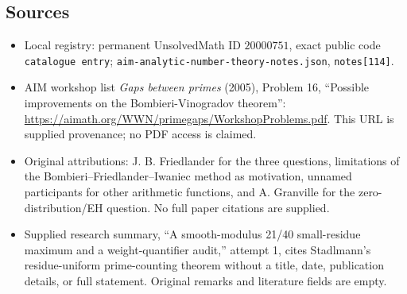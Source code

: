 \documentclass[11pt]{article}
\begin{document}
\subsection{Sources}
\begin{itemize}
\item Local registry: permanent UnsolvedMath ID \(20000751\), exact public code \texttt{catalogue entry}; \texttt{aim-analytic-number-theory-notes.json}, \texttt{notes[114]}.
\item AIM workshop list \emph{Gaps between primes} (2005), Problem 16, ``Possible improvements on the Bombieri-Vinogradov theorem'': \url{https://aimath.org/WWN/primegaps/WorkshopProblems.pdf}. This URL is supplied provenance; no PDF access is claimed.
\item Original attributions: J. B. Friedlander for the three questions, limitations of the Bombieri--Friedlander--Iwaniec method as motivation, unnamed participants for other arithmetic functions, and A. Granville for the zero-distribution/EH question. No full paper citations are supplied.
\item Supplied research summary, ``A smooth-modulus 21/40 small-residue maximum and a weight-quantifier audit,'' attempt 1, cites Stadlmann's residue-uniform prime-counting theorem without a title, date, publication details, or full statement. Original remarks and literature fields are empty.
\end{itemize}
\end{document}
